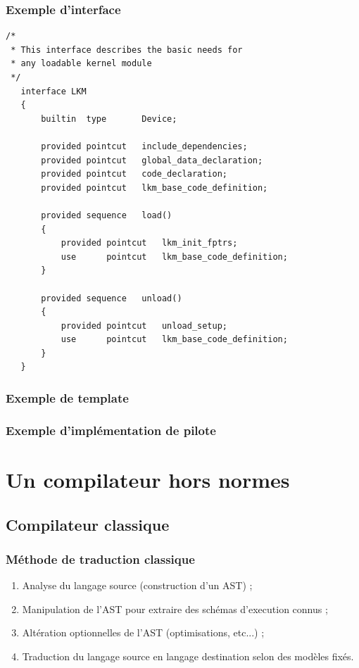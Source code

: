 \documentclass[]{beamer}
\begin{document}
\begin{frame}[containsverbatim]
\frametitle{Exemple d'interface}
\begin{lstlisting}
/*
 * This interface describes the basic needs for
 * any loadable kernel module
 */
   interface LKM
   {
       builtin  type       Device;

       provided pointcut   include_dependencies;
       provided pointcut   global_data_declaration;
       provided pointcut   code_declaration;
       provided pointcut   lkm_base_code_definition;

       provided sequence   load()
       {
           provided pointcut   lkm_init_fptrs;
           use      pointcut   lkm_base_code_definition;
       }

       provided sequence   unload()
       {
           provided pointcut   unload_setup;
           use      pointcut   lkm_base_code_definition;
       }
   }
\end{lstlisting}
\end{frame}

\begin{frame}
\frametitle{Exemple de template}
\end{frame}

\begin{frame}
\frametitle{Exemple d'implémentation de pilote}
\end{frame}




\section{Un compilateur hors normes}

\subsection{Compilateur classique}
\begin{frame}
\frametitle{Méthode de traduction classique}
\begin{enumerate}[<+->]
    \item Analyse du langage source (construction d'un AST) ;
    \item Manipulation de l'AST pour extraire des schémas d'execution connus ;
    \item Altération optionnelles de l'AST (optimisations, etc...) ;
    \item Traduction du langage source en langage destination selon des
            modèles fixés.
\end{enumerate}
\end{frame}
\end{document}
